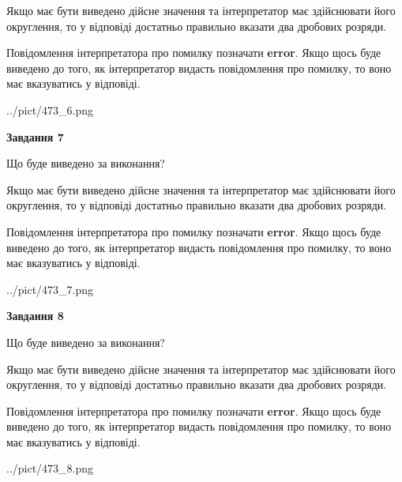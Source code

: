 \documentclass[12pt, ukrainian]{article}
\begin{document}
{\begin {Large}
Якщо має бути виведено дійсне значення та інтерпретатор має здійснювати його округлення, 
то у відповіді достатньо правильно вказати два дробових розряди.

Повідомлення інтерпретатора про помилку позначати \textbf{error}.
Якщо щось буде виведено до того, як інтерпретатор видасть повідомлення про помилку, 
то воно має вказуватись у відповіді. \par

\begin{center}
	{../pict/473_6.png}
\end{center}
\newpage

{\begin {center}\textbf{Завдання 7}\end {center}}\par
Що буде виведено за виконання? \par

Якщо має бути виведено дійсне значення та інтерпретатор має здійснювати його округлення, 
то у відповіді достатньо правильно вказати два дробових розряди.

Повідомлення інтерпретатора про помилку позначати \textbf{error}.
Якщо щось буде виведено до того, як інтерпретатор видасть повідомлення про помилку, 
то воно має вказуватись у відповіді. \par

\begin{center}
	{../pict/473_7.png}
\end{center}
\newpage

{\begin {center}\textbf{Завдання 8}\end {center}}\par
Що буде виведено за виконання? \par

Якщо має бути виведено дійсне значення та інтерпретатор має здійснювати його округлення, 
то у відповіді достатньо правильно вказати два дробових розряди.

Повідомлення інтерпретатора про помилку позначати \textbf{error}.
Якщо щось буде виведено до того, як інтерпретатор видасть повідомлення про помилку, 
то воно має вказуватись у відповіді. \par

\begin{center}
	{../pict/473_8.png}
\end{center}
\newpage


\end{Large}}
\end{document}
